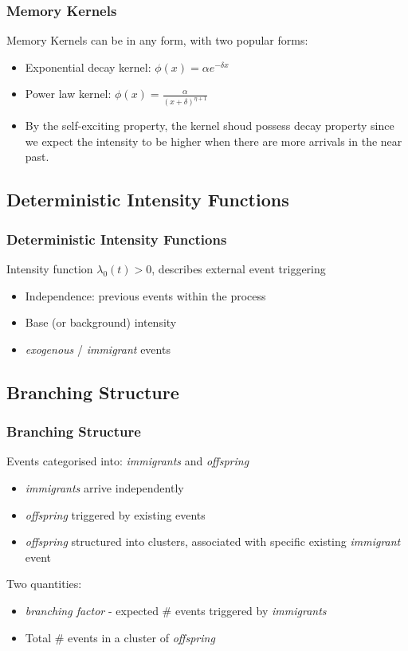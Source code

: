 \documentclass{beamer}
\begin{document}
\begin{frame}
\frametitle{Memory Kernels}
Memory Kernels can be in any form, with two popular forms:
\begin{itemize}
	\item Exponential decay kernel: $\phi(x) = \alpha e^{-\delta x}$
	\item Power law kernel: $\phi(x) = \frac{\alpha}{(x + \delta)^{\eta + 1}}$
	\item By the self-exciting property, the kernel shoud possess decay property since we expect the intensity to be higher when there are more arrivals in the near past.
\end{itemize}
\end{frame}

\subsection{Deterministic Intensity Functions}

\begin{frame}
\frametitle{Deterministic Intensity Functions}
Intensity function $\lambda_0(t)>0$, describes external event triggering
\begin{itemize}
	\item Independence: previous events within the process
	\item Base (or background) intensity
	\item \textit{exogenous} / \textit{immigrant} events
\end{itemize}
\end{frame}

\subsection{Branching Structure}

\begin{frame}
\frametitle{Branching Structure}
Events categorised into: \textit{immigrants} and \textit{offspring}
\begin{itemize}
	\item \textit{immigrants} arrive independently
	\item \textit{offspring} triggered by existing events
	\item \textit{offspring} structured into clusters, associated with specific existing \textit{immigrant} event
\end{itemize}

Two quantities:
\begin{itemize}
	\item \textit{branching factor} - expected \# events triggered by \textit{immigrants}
	\item Total \# events in a cluster of \textit{offspring}
\end{itemize}
\end{frame}
\end{document}
